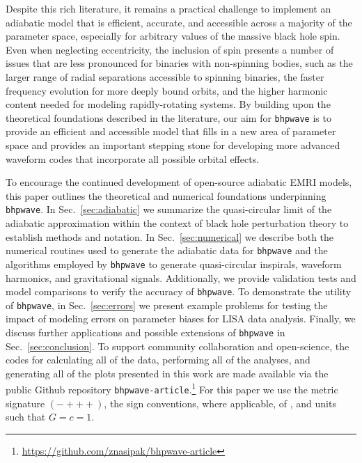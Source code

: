 \documentclass[%
 reprint,
 nofootinbib,
 amsmath,amssymb,
 aps,
 prd,
]{revtex4-2}
\begin{document}
Despite this rich literature, it remains a practical challenge to implement an adiabatic model that is efficient, accurate, and accessible across a majority of the parameter space, especially for arbitrary values of the massive black hole spin. Even when neglecting eccentricity, the inclusion of spin presents a number of issues that are less pronounced for binaries with non-spinning bodies, such as the larger range of radial separations accessible to spinning binaries, the faster frequency evolution for more deeply bound orbits, and the higher harmonic content needed for modeling rapidly-rotating systems. By building upon the theoretical foundations described in the literature, our aim for \texttt{bhpwave} is to provide an efficient and accessible model that fills in a new area of parameter space and provides an important stepping stone for developing more advanced waveform codes that incorporate all possible orbital effects.

To encourage the continued development of open-source adiabatic EMRI models, this paper outlines the theoretical and numerical foundations underpinning \texttt{bhpwave}. In Sec.~\ref{sec:adiabatic} we summarize the quasi-circular limit of the adiabatic approximation within the context of black hole perturbation theory to establish methods and notation. 
In Sec.~\ref{sec:numerical} we describe both the numerical routines used to generate the adiabatic data for \texttt{bhpwave} and the algorithms employed by \texttt{bhpwave} to generate quasi-circular inspirals, waveform harmonics, and gravitational signals. Additionally, we provide validation tests and model comparisons to verify the accuracy of \texttt{bhpwave}. To demonstrate the utility of \texttt{bhpwave}, in Sec.~\ref{sec:errors} we present example problems for testing the impact of modeling errors on parameter biases for LISA data analysis. Finally, we discuss further applications and possible extensions of \texttt{bhpwave} in Sec.~\ref{sec:conclusion}. To support community collaboration and open-science, the codes for calculating all of the data, performing all of the analyses, and generating all of the plots presented in this work are made available via the public Github repository \texttt{bhpwave-article}.\footnote{\href{https://github.com/znasipak/bhpwave-article}{https://github.com/znasipak/bhpwave-article}} For this paper we use the metric signature $(-+++)$, the sign conventions, where applicable, of \cite{MisnThorWhee73}, and units such that $G=c=1$. 
\end{document}
